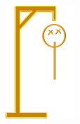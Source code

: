 \begin{figure}[ht]
\begin{subfigure}[b]{0.1\textwidth}
        \includegraphics[width=\textwidth]{./img/gui/hang2.png}
    \end{subfigure}
    \begin{subfigure}[b]{0.1\textwidth}

\end{subfigure}
\end{figure}
